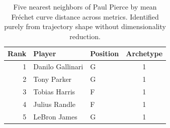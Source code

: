 \begin{table}[htbp]
  \centering\small
  \begin{tabular}{rllc}
    \toprule
    Rank & Player & Position & Archetype \\
    \midrule
    1 & Danilo Gallinari & G & 1 \\
    2 & Tony Parker & G & 1 \\
    3 & Tobias Harris & F & 1 \\
    4 & Julius Randle & F & 1 \\
    5 & LeBron James & G & 1 \\
    \bottomrule
  \end{tabular}
  \caption{Five nearest neighbors of Paul Pierce by mean Fr\'{e}chet curve distance across metrics. Identified purely from trajectory shape without dimensionality reduction.}
  \label{tab:Paul_Pierce_frechet_curve_neighbors}
\end{table}

